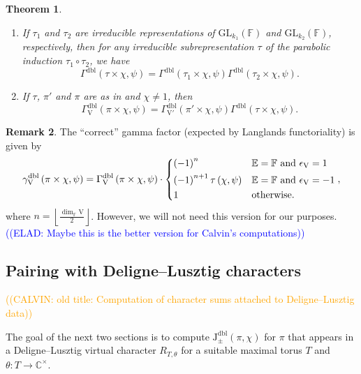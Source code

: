 \documentclass[12pt, reqno]{amsart}
\newtheorem{theorem}{Theorem}[section]
\theoremstyle{definition}
\theoremstyle{definition}
\newtheorem{remark}[theorem]{Remark}
\theoremstyle{definition}
\newcommand{\cComplex}{\mathbb{C}}
\newcommand{\multiplicativegroup}[1]{#1^{\times}}
\newcommand{\hermitianSpace}{\mathrm{V}}
\newcommand{\fieldCharacter}{\psi}
\newcommand{\GL}{\mathrm{GL}}
\newcommand{\finiteField}{\mathbb{F}}
\newcommand{\quadraticExtension}{\mathbb{E}}
\newcommand{\GaussSumSingleCharacter}[2]{\tau\left(#1, #2\right)}
\newcommand{\dblJacobiSumScalar}[2]{\mathrm{J}_{\pm}^{\mathrm{dbl}}\left(#1, #2\right)}
\newcommand{\dblGammaFactor}[3]{\Gamma^{\mathrm{dbl}}\left(#1 \times #2, #3\right)}
\newcommand{\dblGammaFactorSpace}[4]{\Gamma^{\mathrm{dbl}}_{#1}\left(#2 \times #3, #4\right)}
\newcommand{\dblLanglandsGammaFactorSpace}[4]{\gamma^{\mathrm{dbl}}_{#1}\left(#2 \times #3, #4\right)}
\newcommand{\calvin}[1]{\textcolor{orange}{\sffamily ((CALVIN: #1))}}
\newcommand{\elad}[1]{\textcolor{blue}{\sffamily ((ELAD: #1))}}
\begin{document}
\begin{theorem}\label{thm:multiplicativity-in-terms-of-gamma-factors}
	\begin{enumerate}
		\item If $\tau_1$ and $\tau_2$ are irreducible representations of $\GL_{k_1}\left(\finiteField\right)$ and $\GL_{k_2}\left(\finiteField\right)$, respectively, then for any irreducible subrepresentation $\tau$ of the parabolic induction $\tau_1 \circ \tau_2$, we have
		$$\dblGammaFactor{\tau}{\chi}{\fieldCharacter} = \dblGammaFactor{\tau_1}{\chi}{\fieldCharacter} \dblGammaFactor{\tau_2}{\chi}{\fieldCharacter}.$$
		\item If $\tau$, $\pi'$ and $\pi$ are as in  and $\chi \ne 1$, then
		$$\dblGammaFactorSpace{\hermitianSpace}{\pi}{\chi}{\fieldCharacter} = \dblGammaFactorSpace{\hermitianSpace'}{\pi'}{\chi}{\fieldCharacter} \dblGammaFactor{\tau}{\chi}{\fieldCharacter}.$$
	\end{enumerate}
\end{theorem}

\begin{remark}
	The ``correct'' gamma factor (expected by Langlands functoriality) is given by $$\dblLanglandsGammaFactorSpace{\hermitianSpace}{\pi}{\chi}{\fieldCharacter} = \dblGammaFactorSpace{\hermitianSpace}{\pi}{\chi}{\fieldCharacter} \cdot \begin{dcases}
				\left(-1\right)^n & \quadraticExtension = \finiteField \text{ and } \epsilon_{\hermitianSpace} = 1\\
				\left(-1\right)^{n+1} \GaussSumSingleCharacter{\chi} {\fieldCharacter} & \quadraticExtension = \finiteField \text{ and } \epsilon_{\hermitianSpace} = -1 \\
				1 & \text{otherwise.}
	\end{dcases},$$
	where $n = \left\lfloor \frac{\dim_{\finiteField} \hermitianSpace}{2} \right\rfloor$.
	However, we will not need this version for our purposes. \elad{Maybe this is the better version for Calvin's computations}
\end{remark}

\subsection{Pairing with Deligne--Lusztig characters}
\calvin{old title: Computation of character sums attached to Deligne--Lusztig data}

The goal of the next two sections is to compute $\dblJacobiSumScalar{\pi}{\chi}$ for $\pi$ that appears in a Deligne--Lusztig virtual character $R_{T,\theta}$ for a suitable maximal torus $T$ and $\theta \colon T \to \multiplicativegroup{\cComplex}$.
\end{document}

